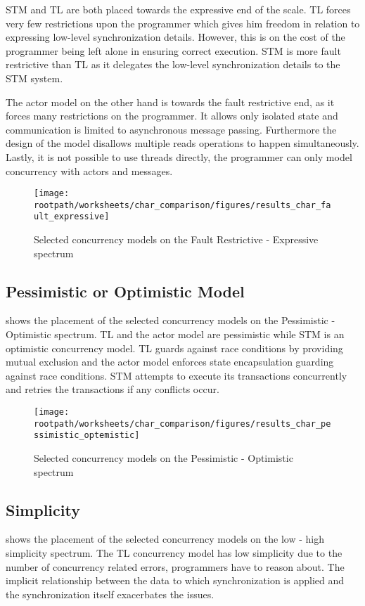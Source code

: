 \ac{STM} and \ac{TL} are both placed towards the expressive end of the scale. \ac{TL} forces very few restrictions upon the programmer which gives him freedom in relation to expressing low-level synchronization details. However, this is on the cost of the programmer being left alone in ensuring correct execution. \ac{STM} is more fault restrictive than \ac{TL} as it delegates the low-level synchronization details to the STM system. 

The actor model on the other hand is towards the fault restrictive end, as it forces many restrictions on the programmer. It allows only isolated state and communication is limited to asynchronous message passing. Furthermore the design of the model disallows multiple reads operations to happen simultaneously. Lastly, it is not possible to use threads directly, the programmer can only model concurrency with actors and messages.

\begin{figure}[htbp]
\centering
 \texttt{[image: \\rootpath/worksheets/char\_comparison/figures/results\_char\_fault\_expressive]} 
 \caption{Selected concurrency models on the Fault Restrictive - Expressive spectrum}
\label{fig:results_char_fault_expressive}
\end{figure}

\subsection{Pessimistic or Optimistic Model}
 shows the placement of the selected concurrency models on the Pessimistic - Optimistic spectrum. \ac{TL} and the actor model are pessimistic while \ac{STM} is an optimistic concurrency model. \ac{TL} guards against race conditions by providing mutual exclusion and the actor model enforces state encapsulation guarding against race conditions. \ac{STM} attempts to execute its transactions concurrently and retries the transactions if any conflicts occur.

\begin{figure}[htbp]
\centering
 \texttt{[image: \\rootpath/worksheets/char\_comparison/figures/results\_char\_pessimistic\_optemistic]} 
 \caption{Selected concurrency models on the Pessimistic - Optimistic spectrum}
\label{fig:results_char_pes_opti}
\end{figure}

\subsection{Simplicity}
 shows the placement of the selected concurrency models on the low - high simplicity spectrum. The \ac{TL} concurrency model has low simplicity due to the number of concurrency related errors, programmers have to reason about. The implicit relationship between the data to which synchronization is applied and the synchronization itself exacerbates the issues.

